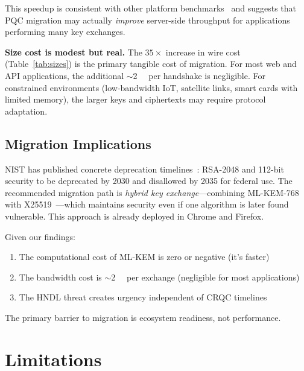 \documentclass[conference]{IEEEtran}
\begin{document}
This speedup is consistent with other platform benchmarks~\cite{bos2018} and suggests that PQC migration may actually \emph{improve} server-side throughput for applications performing many key exchanges.

\textbf{Size cost is modest but real.} The $35\times$ increase in wire cost (Table~\ref{tab:sizes}) is the primary tangible cost of migration. For most web and API applications, the additional $\sim$\SI{2}{\kilo\byte} per handshake is negligible. For constrained environments (low-bandwidth IoT, satellite links, smart cards with limited memory), the larger keys and ciphertexts may require protocol adaptation.

\subsection{Migration Implications}

NIST has published concrete deprecation timelines~\cite{nistir8547}: RSA-2048 and 112-bit security to be deprecated by 2030 and disallowed by 2035 for federal use. The recommended migration path is \emph{hybrid key exchange}---combining ML-KEM-768 with X25519~\cite{langley2024}---which maintains security even if one algorithm is later found vulnerable. This approach is already deployed in Chrome and Firefox.

Given our findings:
\begin{enumerate}[leftmargin=*]
    \item The computational cost of ML-KEM is zero or negative (it's faster)
    \item The bandwidth cost is $\sim$\SI{2}{\kilo\byte} per exchange (negligible for most applications)
    \item The HNDL threat creates urgency independent of CRQC timelines
\end{enumerate}
The primary barrier to migration is ecosystem readiness, not performance.

\section{Limitations}
\label{sec:limitations}
\end{document}
